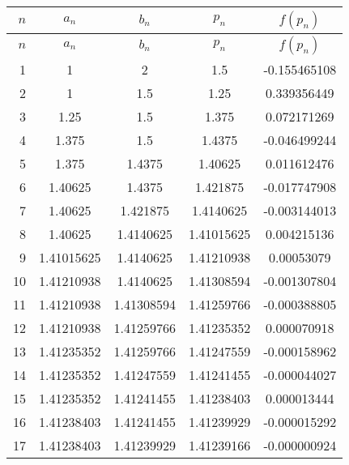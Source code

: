 \documentclass[../../Assignments.tex]{subfiles}
\begin{document}
\begin{solution}
\begin{enumerate}[label = (\alph*)]
            \begin{longtable}{r S[table-format=1.8] S[table-format=1.8] S[table-format=1.8] S[table-format=-1.9]}
                \toprule
                \(n\)  &   {\(a_n\)}   &   {\(b_n\)}   &   {\(p_n\)}   &  {\(f(p_n)\)}  \\
                \midrule
                \endfirsthead
                \toprule
                \(n\)  &   {\(a_n\)}   &   {\(b_n\)}   &   {\(p_n\)}   &  {\(f(p_n)\)}  \\
                \midrule
                  &  1            &  2            &  1.5          &  -0.155465108  \\
                    2  &  1            &  1.5          &  1.25         &   0.339356449  \\
                    3  &  1.25         &  1.5          &  1.375        &   0.072171269  \\
                    4  &  1.375        &  1.5          &  1.4375       &  -0.046499244  \\
                    5  &  1.375        &  1.4375       &  1.40625      &   0.011612476  \\
                    6  &  1.40625      &  1.4375       &  1.421875     &  -0.017747908  \\
                    7  &  1.40625      &  1.421875     &  1.4140625    &  -0.003144013  \\
                    8  &  1.40625      &  1.4140625    &  1.41015625   &   0.004215136  \\
                    9  &  1.41015625   &  1.4140625    &  1.41210938   &   0.00053079   \\
                   10  &  1.41210938   &  1.4140625    &  1.41308594   &  -0.001307804  \\
                   11  &  1.41210938   &  1.41308594   &  1.41259766   &  -0.000388805  \\
                   12  &  1.41210938   &  1.41259766   &  1.41235352   &   0.000070918  \\
                   13  &  1.41235352   &  1.41259766   &  1.41247559   &  -0.000158962  \\
                   14  &  1.41235352   &  1.41247559   &  1.41241455   &  -0.000044027  \\
                   15  &  1.41235352   &  1.41241455   &  1.41238403   &   0.000013444  \\
                   16  &  1.41238403   &  1.41241455   &  1.41239929   &  -0.000015292  \\
                   17  &  1.41238403   &  1.41239929   &  1.41239166   &  -0.000000924  \\
                \bottomrule
            \end{longtable}


\end{enumerate}
\end{solution}
\end{document}
